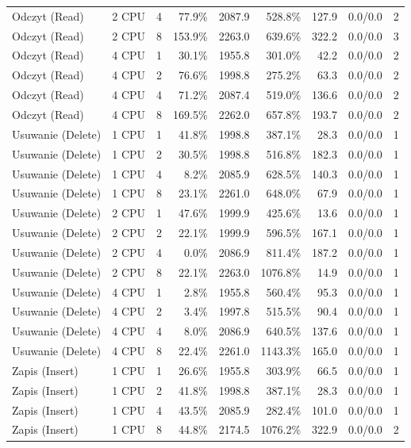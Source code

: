 \begin{table}[ht]
{\begin{tabular}{llcrrrrcc}
Odczyt (Read) & 2 CPU & 4 & 77.9\% & 2087.9 & 528.8\% & 127.9 & 0.0/0.0 & 2 \\
Odczyt (Read) & 2 CPU & 8 & 153.9\% & 2263.0 & 639.6\% & 322.2 & 0.0/0.0 & 3 \\
Odczyt (Read) & 4 CPU & 1 & 30.1\% & 1955.8 & 301.0\% & 42.2 & 0.0/0.0 & 2 \\
Odczyt (Read) & 4 CPU & 2 & 76.6\% & 1998.8 & 275.2\% & 63.3 & 0.0/0.0 & 2 \\
Odczyt (Read) & 4 CPU & 4 & 71.2\% & 2087.4 & 519.0\% & 136.6 & 0.0/0.0 & 2 \\
Odczyt (Read) & 4 CPU & 8 & 169.5\% & 2262.0 & 657.8\% & 193.7 & 0.0/0.0 & 2 \\
Usuwanie (Delete) & 1 CPU & 1 & 41.8\% & 1998.8 & 387.1\% & 28.3 & 0.0/0.0 & 1 \\
Usuwanie (Delete) & 1 CPU & 2 & 30.5\% & 1998.8 & 516.8\% & 182.3 & 0.0/0.0 & 1 \\
Usuwanie (Delete) & 1 CPU & 4 & 8.2\% & 2085.9 & 628.5\% & 140.3 & 0.0/0.0 & 1 \\
Usuwanie (Delete) & 1 CPU & 8 & 23.1\% & 2261.0 & 648.0\% & 67.9 & 0.0/0.0 & 1 \\
Usuwanie (Delete) & 2 CPU & 1 & 47.6\% & 1999.9 & 425.6\% & 13.6 & 0.0/0.0 & 1 \\
Usuwanie (Delete) & 2 CPU & 2 & 22.1\% & 1999.9 & 596.5\% & 167.1 & 0.0/0.0 & 1 \\
Usuwanie (Delete) & 2 CPU & 4 & 0.0\% & 2086.9 & 811.4\% & 187.2 & 0.0/0.0 & 1 \\
Usuwanie (Delete) & 2 CPU & 8 & 22.1\% & 2263.0 & 1076.8\% & 14.9 & 0.0/0.0 & 1 \\
Usuwanie (Delete) & 4 CPU & 1 & 2.8\% & 1955.8 & 560.4\% & 95.3 & 0.0/0.0 & 1 \\
Usuwanie (Delete) & 4 CPU & 2 & 3.4\% & 1997.8 & 515.5\% & 90.4 & 0.0/0.0 & 1 \\
Usuwanie (Delete) & 4 CPU & 4 & 8.0\% & 2086.9 & 640.5\% & 137.6 & 0.0/0.0 & 1 \\
Usuwanie (Delete) & 4 CPU & 8 & 22.4\% & 2261.0 & 1143.3\% & 165.0 & 0.0/0.0 & 1 \\
Zapis (Insert) & 1 CPU & 1 & 26.6\% & 1955.8 & 303.9\% & 66.5 & 0.0/0.0 & 1 \\
Zapis (Insert) & 1 CPU & 2 & 41.8\% & 1998.8 & 387.1\% & 28.3 & 0.0/0.0 & 1 \\
Zapis (Insert) & 1 CPU & 4 & 43.5\% & 2085.9 & 282.4\% & 101.0 & 0.0/0.0 & 1 \\
Zapis (Insert) & 1 CPU & 8 & 44.8\% & 2174.5 & 1076.2\% & 322.9 & 0.0/0.0 & 2 \\

\end{tabular}}
\end{table}
